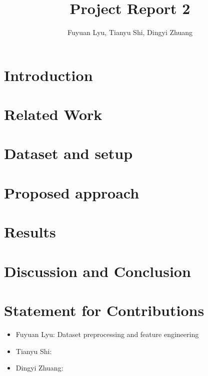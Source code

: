 \documentclass[]{scrartcl}
\title{Project Report 2}
\author{Fuyuan Lyu, Tianyu Shi, Dingyi Zhuang}
\begin{document}
\maketitle

\begin{abstract}

\end{abstract}

\section{Introduction}

\section{Related Work}

\section{Dataset and setup}

\section{Proposed approach}

\section{Results}

\section{Discussion and Conclusion}

\section{Statement for Contributions}
\begin{itemize}
	\item Fuyuan Lyu: Dataset preprocessing and feature engineering
	\item Tianyu Shi:
	\item Dingyi Zhuang:
\end{itemize}
\end{document}
